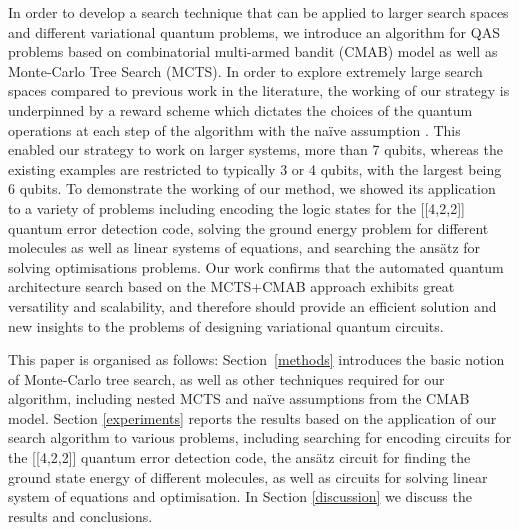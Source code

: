\documentclass[a4paper,onecolumn,11pt]{quantumarticle}
\begin{document}
In order to develop a search technique that can be applied to larger search spaces and different variational quantum problems, we introduce an algorithm for QAS problems based on combinatorial multi-armed bandit (CMAB) model as well as Monte-Carlo Tree Search (MCTS). In order to explore extremely large search spaces compared to previous work in the literature, the working of our strategy is underpinned by a reward scheme which dictates the choices of the quantum operations at each step of the algorithm with the na\"ive assumption \cite{CMAB_RTS}. This enabled our strategy to work on larger systems, more than 7 qubits, whereas the existing examples \cite{zhang2021differentiable, chen2021quantum, kuo2021quantum, zhang2021differentiable, du2020quantum, zhang2021neural} are restricted to typically 3 or 4 qubits, with the largest being 6 qubits. To demonstrate the working of our method, we showed its application to a variety of problems including encoding the logic states for the [[4,2,2]] quantum error detection code, solving the ground energy problem for different molecules as well as linear systems of equations, and searching the ans\"atz for solving optimisations problems. Our work confirms that the automated quantum architecture search based on the MCTS+CMAB approach exhibits great versatility and scalability, and therefore should provide an efficient solution and new insights to the problems of designing variational quantum circuits.

This paper is organised as follows: Section~\ref{methods} introduces the basic notion of Monte-Carlo tree search, as well as other techniques required for our algorithm, including nested MCTS and na\"ive assumptions from the CMAB model. Section \ref{experiments}  reports the results based on the application of our search algorithm to various problems, including searching for encoding circuits for the [[4,2,2]] quantum error detection code, the ans\"atz circuit for finding the ground state energy of different molecules, as well as circuits for solving linear system of equations and optimisation. In Section \ref{discussion} we discuss the results and conclusions.
\end{document}
